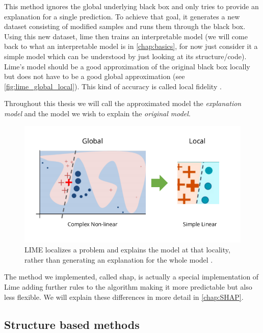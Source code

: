 This method ignores the global underlying black box and only tries to provide an explanation for a single prediction. To achieve that goal, it generates a new dataset consisting of modified samples and runs them through the black box. Using this new dataset, lime then trains an interpretable model (we will come back to what an interpretable model is in \autoref{chap:basics}, for now just consider it a simple model which can be understood by just looking at its structure/code). Lime's model should be a good approximation of the original black box locally but does not have to be a good global approximation (see \autoref{fig:lime_global_local}). This kind of accuracy is called local fidelity \cite{Lime_shap_explained}. 


Throughout this thesis we will call the approximated model the \textit{explanation model} and the model we wish to explain the \textit{original model}.

\begin{figure}[H]
    \centering
    \includegraphics[width=\linewidth]{images/02_related_works/Lime_global_local.png}
    \caption{LIME localizes a problem and explains the model at that locality, rather than generating an explanation for the whole model \cite{Lime_paper}.}
    \label{fig:lime_global_local}
\end{figure}

The method we implemented, called shap, is actually a special implementation of Lime adding further rules to the algorithm making it more predictable but also less flexible. We will explain these differences in more detail in \autoref{chap:SHAP}.

\subsection{Structure based methods}

